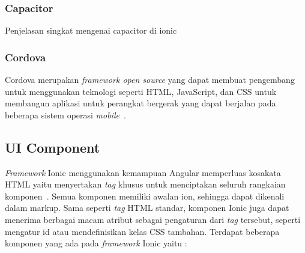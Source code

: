 \subsubsection{Capacitor}
\label{subsec:capacitor}
Penjelasan singkat mengenai capacitor di ionic

\subsubsection{Cordova}
\label{subsec:cordova}
Cordova merupakan {\it framework open source} yang dapat membuat pengembang untuk menggunakan teknologi seperti HTML, JavaScript, dan CSS untuk membangun aplikasi untuk perangkat bergerak yang dapat berjalan pada beberapa sistem operasi {\it mobile}~\cite{gonsalves:18:evaluating}. 

\subsection{UI Component}
\label{subsec:uiComponent}
{\it Framework} Ionic menggunakan kemampuan Angular memperluas kosakata HTML yaitu menyertakan {\it tag} khusus untuk menciptakan seluruh rangkaian komponen~\cite{griffith:17:mobile}. Semua komponen memiliki awalan ion, sehingga dapat dikenali dalam markup. Sama seperti {\it tag} HTML standar, komponen Ionic juga dapat menerima berbagai macam atribut sebagai pengaturan dari {\it tag} tersebut, seperti mengatur id atau mendefinisikan kelas CSS tambahan. Terdapat beberapa komponen yang ada pada {\it framework} Ionic yaitu :
